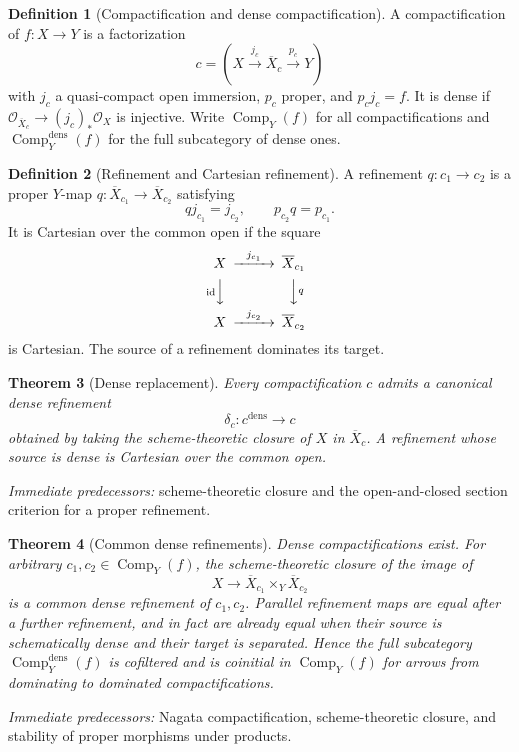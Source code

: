 \documentclass[10pt]{article}
\newtheorem{theorem}{Theorem}[section]
\theoremstyle{definition}
\newtheorem{definition}[theorem]{Definition}
\newcommand{\Comp}{\operatorname{Comp}}
\newcommand{\pred}[1]{\par\smallskip\begingroup\footnotesize\raggedright
\emph{Immediate predecessors:} #1.\par\endgroup}
\begin{document}
\begin{definition}[Compactification and dense compactification]
A compactification of \(f:X\to Y\) is a factorization
\[
 c=(X\xrightarrow{j_c}\overline X_c\xrightarrow{p_c}Y)
\]
with \(j_c\) a quasi-compact open immersion, \(p_c\) proper, and
\(p_cj_c=f\).  It is dense if
\(\mathcal O_{\overline X_c}\to(j_c)_*\mathcal O_X\) is injective.
Write \(\Comp_Y(f)\) for all compactifications and
\(\Comp_Y^{\mathrm{dens}}(f)\) for the full subcategory of dense ones.
\end{definition}

\begin{definition}[Refinement and Cartesian refinement]
A refinement \(q:c_1\to c_2\) is a proper \(Y\)-map
\(q:\overline X_{c_1}\to\overline X_{c_2}\) satisfying
\[
 qj_{c_1}=j_{c_2},\qquad p_{c_2}q=p_{c_1}.
\]
It is Cartesian over the common open if the square
\[
\begin{CD}
 X@>{j_{c_1}}>>\overline X_{c_1}\\
 @V{\operatorname{id}}VV @VV{q}V\\
 X@>{j_{c_2}}>>\overline X_{c_2}
\end{CD}
\]
is Cartesian.  The source of a refinement dominates its target.
\end{definition}

\begin{theorem}[Dense replacement]
Every compactification \(c\) admits a canonical dense refinement
\[
 \delta_c:c^{\mathrm{dens}}\longrightarrow c
\]
obtained by taking the scheme-theoretic closure of \(X\) in
\(\overline X_c\).  A refinement whose source is dense is Cartesian over
the common open.
\end{theorem}
\pred{scheme-theoretic closure and the open-and-closed section criterion for a proper refinement}

\begin{theorem}[Common dense refinements]
Dense compactifications exist.  For arbitrary
\(c_1,c_2\in\Comp_Y(f)\), the scheme-theoretic closure of the image of
\[
 X\longrightarrow\overline X_{c_1}\times_Y\overline X_{c_2}
\]
is a common dense refinement of \(c_1,c_2\).  Parallel refinement maps are
equal after a further refinement, and in fact are already equal when their
source is schematically dense and their target is separated.  Hence the
full subcategory \(\Comp_Y^{\mathrm{dens}}(f)\) is cofiltered and is
coinitial in \(\Comp_Y(f)\) for arrows from dominating to dominated
compactifications.
\end{theorem}
\pred{Nagata compactification, scheme-theoretic closure, and stability of proper morphisms under products}
\end{document}
